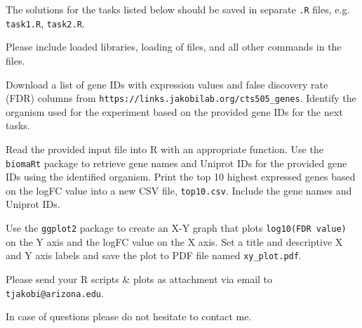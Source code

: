 \documentclass[11pt,largemargins, letter]{homework}
\begin{document}
\maketitle

The solutions for the tasks listed below should be saved in separate \texttt{.R} files, e.g. \texttt{task1.R}, \texttt{task2.R}.

Please include loaded libraries, loading of files, and all other commands in the files.

\question

  \begin{alphaparts}
    \questionpart Download a list of gene IDs with expression values and false discovery rate (FDR) columns from \texttt{https://links.jakobilab.org/cts505\_genes}.
    \questionpart Identify the organism used for the experiment based on the provided gene IDs for the next tasks.
  \end{alphaparts}


\question

  \begin{alphaparts}
    \questionpart Read the provided input file into R with an appropriate function.
    \questionpart Use the \texttt{biomaRt} package to retrieve gene names and Uniprot IDs for the provided gene IDs using the identified organism.
    \questionpart Print the top 10 highest expressed genes based on the logFC value into a new CSV file, \texttt{top10.csv}.
    Include the gene names and Uniprot IDs.
  \end{alphaparts}

\question

  \begin{alphaparts}
    \questionpart Use the \texttt{ggplot2} package to create an X-Y graph that plots \texttt{log10(FDR value)} on the Y axis and the logFC value on the X axis.
    \questionpart Set a title and descriptive X and Y axis labels and save the plot to PDF file named \texttt{xy\_plot.pdf}.
  \end{alphaparts}

Please send your R scripts \& plots as attachment via email to \texttt{tjakobi@arizona.edu}.

In case of questions please do not hesitate to contact me.
\end{document}
